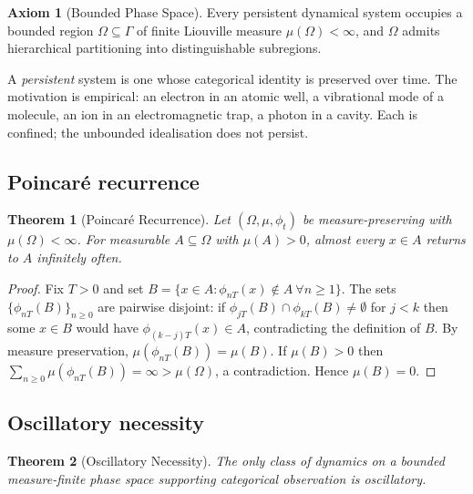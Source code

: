 \documentclass[twocolumn,10pt,a4paper]{article}
\theoremstyle{thmstyle}
\newtheorem{theorem}{Theorem}[section]
\theoremstyle{definition}
\newtheorem{axiom}{Axiom}
\theoremstyle{remark}
\begin{document}
\begin{axiom}[Bounded Phase Space]
\label{ax:bps}
Every persistent dynamical system occupies a bounded region
$\Omega\subseteq\Gamma$ of finite Liouville measure
$\mu(\Omega)<\infty$, and $\Omega$ admits hierarchical partitioning
into distinguishable subregions.
\end{axiom}

A \emph{persistent} system is one whose categorical identity is
preserved over time. The motivation is empirical: an electron in an
atomic well, a vibrational mode of a molecule, an ion in an
electromagnetic trap, a photon in a cavity. Each is confined; the
unbounded idealisation does not persist.

\subsection{Poincar\'{e} recurrence}

\begin{theorem}[Poincar\'{e} Recurrence]
\label{thm:poincare}
Let $(\Omega,\mu,\phi_{t})$ be measure-preserving with
$\mu(\Omega)<\infty$. For measurable $A\subseteq\Omega$ with
$\mu(A)>0$, almost every $x\in A$ returns to $A$ infinitely often.
\end{theorem}

\begin{proof}
Fix $T>0$ and set $B=\{x\in A:\phi_{nT}(x)\notin A\ \forall n\geq 1\}$.
The sets $\{\phi_{nT}(B)\}_{n\geq 0}$ are pairwise disjoint: if
$\phi_{jT}(B)\cap\phi_{kT}(B)\neq\emptyset$ for $j<k$ then some
$x\in B$ would have $\phi_{(k-j)T}(x)\in A$, contradicting the
definition of $B$. By measure preservation,
$\mu(\phi_{nT}(B))=\mu(B)$. If $\mu(B)>0$ then
$\sum_{n\geq 0}\mu(\phi_{nT}(B))=\infty>\mu(\Omega)$, a contradiction.
Hence $\mu(B)=0$.
\end{proof}

\subsection{Oscillatory necessity}

\begin{theorem}[Oscillatory Necessity]
\label{thm:osc}
The only class of dynamics on a bounded measure-finite phase space
supporting categorical observation is oscillatory.
\end{theorem}
\end{document}
